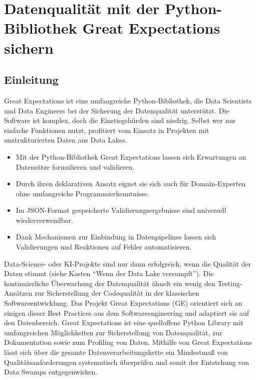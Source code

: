%
%
%
%



\chapter{Datenqualität mit der Python-Bibliothek Great Expectations sichern}

\section{Einleitung}

Great Expectations ist eine umfangreiche Python-Bibliothek, die Data Scientists und Data Engineers bei der Sicherung der Datenqualität unterstützt. Die Software ist komplex, doch die Einstiegshürden sind niedrig. Selbst wer nur einfache Funktionen nutzt, profitiert vom Einsatz in Projekten mit unstrukturierten Daten aus Data Lakes. 

\begin{itemize}
  \item Mit der Python-Bibliothek Great Expectations lassen sich Erwartungen an Datensätze formulieren und validieren.
  \item Durch ihren deklarativen Ansatz eignet sie sich auch für Domain-Experten ohne umfangreiche Programmierkenntnisse.
  \item Im JSON-Format gespeicherte Validierungsergebnisse sind universell wiederverwendbar.
  \item Dank Mechanismen zur Einbindung in Datenpipelines lassen sich Validierungen und Reaktionen auf Fehler automatisieren.
\end{itemize}

Data-Science- oder KI-Projekte sind nur dann erfolgreich, wenn die Qualität der Daten stimmt (siehe Kasten ``Wenn der Data Lake versumpft''). Die kontinuierliche Überwachung der Datenqualität ähnelt ein wenig den Testing-Ansätzen zur Sicherstellung der Codequalität in der klassischen Softwareentwicklung. Das Projekt Great Expectations (GE) orientiert sich an einigen dieser Best Practices aus dem Softwareengineering und adaptiert sie auf den Datenbereich. Great Expectations ist eine quelloffene Python Library mit umfangreichen Möglichkeiten zur Sicherstellung von Datenqualität, zur Dokumentation sowie zum Profiling von Daten. Mithilfe von Great Expectations lässt sich über die gesamte Datenverarbeitungskette ein Mindestmaß von Qualitätsanforderungen systematisch überprüfen und somit der Entstehung von Data Swamps entgegenwirken. 
 
